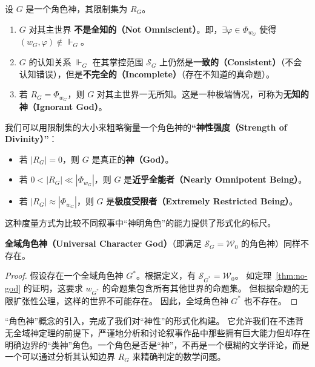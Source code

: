 \begin{theorem}[角色神的性质]
    设 \( G \) 是一个角色神，其限制集为 \( R_G \)。
    \begin{enumerate}
        \item \( G \) 对其主世界 \textbf{不是全知的（Not Omniscient）}。即，\( \exists \varphi \in \Phi_{w_G} \) 使得 \( (w_G, \varphi) \notin \Vdash_G \)。
        \item \( G \) 的认知关系 \( \Vdash_G \) 在其掌控范围 \( \mathcal{S}_G \) 上仍然是\textbf{一致的（Consistent）}（不会认知错误），但是\textbf{不完全的（Incomplete）}（存在不知道的真命题）。
        \item 若 \( R_G = \Phi_{w_G} \)，则 \( G \) 对其主世界一无所知。这是一种极端情况，可称为\textbf{无知的神（Ignorant God）}。
    \end{enumerate}
\end{theorem}

\begin{definition}[神性强度]
    我们可以用限制集的大小来粗略衡量一个角色神的\textbf{“神性强度（Strength of Divinity）”}：
    \begin{itemize}
        \item 若 \( |R_G| = 0 \)，则 \( G \) 是真正的\textbf{神（God）}。
        \item 若 \( 0 < |R_G| \ll |\Phi_{w_G}| \)，则 \( G \) 是\textbf{近乎全能者（Nearly Omnipotent Being）}。
        \item 若 \( |R_G| \approx |\Phi_{w_G}| \)，则 \( G \) 是\textbf{极度受限者（Extremely Restricted Being）}。
    \end{itemize}
    这种度量方式为比较不同叙事中“神明角色”的能力提供了形式化的标尺。
\end{definition}

\begin{theorem}[无角色神定理]
    \textbf{全域角色神（Universal Character God）}（即满足 \( \mathcal{S}_G = \mathcal{W}_0 \) 的角色神）同样不存在。

\end{theorem}
\begin{proof}
    假设存在一个全域角色神 \( G^* \)。根据定义，有 \( \mathcal{S}_{G^*} = \mathcal{W}_0 \)。
    如定理~\ref{thm:no-god} 的证明，这要求 \( w_{G^*} \) 的命题集包含所有其他世界的命题集。
    但根据命题的无限扩张性公理，这样的世界不可能存在。
    因此，全域角色神 \( G^* \) 也不存在。
\end{proof}


“角色神”概念的引入，完成了我们对“神性”的形式化构建。
它允许我们在不违背无全域神定理的前提下，严谨地分析和讨论叙事作品中那些拥有巨大能力但却存在明确边界的“类神”角色。一个角色是否是“神”，不再是一个模糊的文学评论，而是一个可以通过分析其认知边界 \( R_G \) 来精确判定的数学问题。

